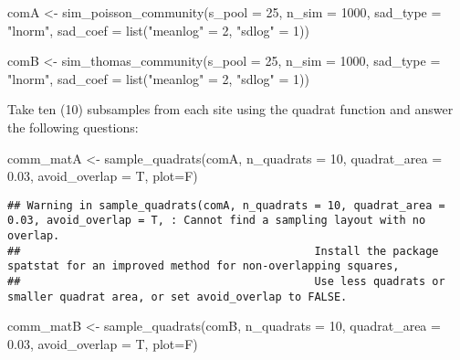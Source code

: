 \documentclass[
]{article}
\newenvironment{Shaded}{\begin{snugshade}}{\end{snugshade}}
\newcommand{\AttributeTok}[1]{\textcolor[rgb]{0.77,0.63,0.00}{#1}}
\newcommand{\DecValTok}[1]{\textcolor[rgb]{0.00,0.00,0.81}{#1}}
\newcommand{\FloatTok}[1]{\textcolor[rgb]{0.00,0.00,0.81}{#1}}
\newcommand{\FunctionTok}[1]{\textcolor[rgb]{0.00,0.00,0.00}{#1}}
\newcommand{\NormalTok}[1]{#1}
\newcommand{\OtherTok}[1]{\textcolor[rgb]{0.56,0.35,0.01}{#1}}
\newcommand{\StringTok}[1]{\textcolor[rgb]{0.31,0.60,0.02}{#1}}
\begin{document}
\begin{Shaded}
\begin{Highlighting}[]
\NormalTok{comA }\OtherTok{\textless{}{-}} \FunctionTok{sim\_poisson\_community}\NormalTok{(}\AttributeTok{s\_pool =} \DecValTok{25}\NormalTok{, }\AttributeTok{n\_sim =} \DecValTok{1000}\NormalTok{, }\AttributeTok{sad\_type =} \StringTok{"lnorm"}\NormalTok{, }
        \AttributeTok{sad\_coef =} \FunctionTok{list}\NormalTok{(}\StringTok{"meanlog"} \OtherTok{=} \DecValTok{2}\NormalTok{, }\StringTok{"sdlog"} \OtherTok{=} \DecValTok{1}\NormalTok{))}

\NormalTok{comB }\OtherTok{\textless{}{-}} \FunctionTok{sim\_thomas\_community}\NormalTok{(}\AttributeTok{s\_pool =} \DecValTok{25}\NormalTok{, }\AttributeTok{n\_sim =} \DecValTok{1000}\NormalTok{, }\AttributeTok{sad\_type =} \StringTok{"lnorm"}\NormalTok{, }
        \AttributeTok{sad\_coef =} \FunctionTok{list}\NormalTok{(}\StringTok{"meanlog"} \OtherTok{=} \DecValTok{2}\NormalTok{, }\StringTok{"sdlog"} \OtherTok{=} \DecValTok{1}\NormalTok{))}
\end{Highlighting}
\end{Shaded}

Take ten (10) subsamples from each site using the quadrat function and
answer the following questions:

\begin{Shaded}
\begin{Highlighting}[]
\NormalTok{comm\_matA }\OtherTok{\textless{}{-}} \FunctionTok{sample\_quadrats}\NormalTok{(comA, }\AttributeTok{n\_quadrats =} \DecValTok{10}\NormalTok{, }\AttributeTok{quadrat\_area =} \FloatTok{0.03}\NormalTok{, }
             \AttributeTok{avoid\_overlap =}\NormalTok{ T, }\AttributeTok{plot=}\NormalTok{F)}
\end{Highlighting}
\end{Shaded}

\begin{verbatim}
## Warning in sample_quadrats(comA, n_quadrats = 10, quadrat_area = 0.03, avoid_overlap = T, : Cannot find a sampling layout with no overlap.
##                                             Install the package spatstat for an improved method for non-overlapping squares,
##                                             Use less quadrats or smaller quadrat area, or set avoid_overlap to FALSE.
\end{verbatim}

\begin{Shaded}
\begin{Highlighting}[]
\NormalTok{comm\_matB }\OtherTok{\textless{}{-}} \FunctionTok{sample\_quadrats}\NormalTok{(comB, }\AttributeTok{n\_quadrats =} \DecValTok{10}\NormalTok{, }\AttributeTok{quadrat\_area =} \FloatTok{0.03}\NormalTok{, }
             \AttributeTok{avoid\_overlap =}\NormalTok{ T, }\AttributeTok{plot=}\NormalTok{F)}
\end{Highlighting}
\end{Shaded}
\end{document}
